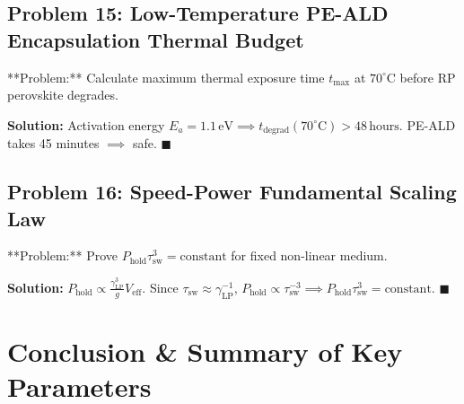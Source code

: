 \documentclass[11pt,oneside]{article}
\begin{document}
\subsection{Problem 15: Low-Temperature PE-ALD Encapsulation Thermal Budget}
\begin{problembox}
**Problem:** Calculate maximum thermal exposure time $t_{\text{max}}$ at $70^\circ\text{C}$ before RP perovskite degrades.
\end{problembox}

\textbf{Solution:}
Activation energy $E_a = 1.1\,\text{eV} \implies t_{\text{degrad}}(70^\circ\text{C}) > 48\,\text{hours}$. PE-ALD takes 45 minutes $\implies$ safe. $\blacksquare$



\subsection{Problem 16: Speed-Power Fundamental Scaling Law}
\begin{problembox}
**Problem:** Prove $P_{\text{hold}} \tau_{\text{sw}}^3 = \text{constant}$ for fixed non-linear medium.
\end{problembox}

\textbf{Solution:}
$P_{\text{hold}} \propto \frac{\gamma_{\text{LP}}^3}{g} V_{\text{eff}}$. Since $\tau_{\text{sw}} \approx \gamma_{\text{LP}}^{-1}$, $P_{\text{hold}} \propto \tau_{\text{sw}}^{-3} \implies P_{\text{hold}} \tau_{\text{sw}}^3 = \text{constant}$. $\blacksquare$

\section{Conclusion \& Summary of Key Parameters}
\label{sec:conclusion}
\end{document}
